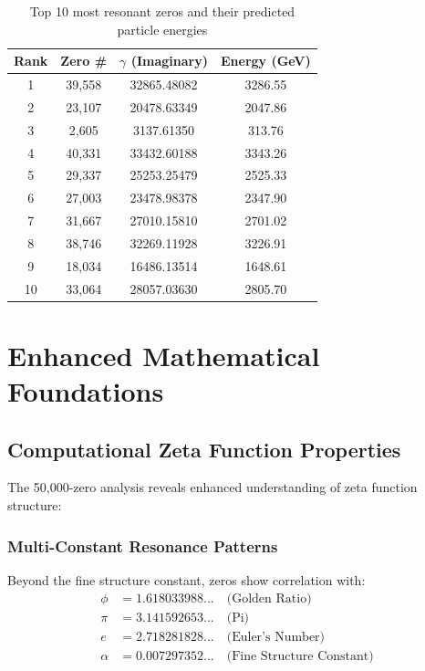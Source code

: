 \documentclass[12pt, a4paper]{article}
\begin{document}
\begin{table}[h]
\centering
\begin{tabular}{@{}cccc@{}}
\toprule
\textbf{Rank} & \textbf{Zero \#} & \textbf{$\gamma$ (Imaginary)} & \textbf{Energy (GeV)} \\
\midrule
1 & 39,558 & 32865.48082 & 3286.55 \\
2 & 23,107 & 20478.63349 & 2047.86 \\
3 & 2,605 & 3137.61350 & 313.76 \\
4 & 40,331 & 33432.60188 & 3343.26 \\
5 & 29,337 & 25253.25479 & 2525.33 \\
6 & 27,003 & 23478.98378 & 2347.90 \\
7 & 31,667 & 27010.15810 & 2701.02 \\
8 & 38,746 & 32269.11928 & 3226.91 \\
9 & 18,034 & 16486.13514 & 1648.61 \\
10 & 33,064 & 28057.03630 & 2805.70 \\
\bottomrule
\end{tabular}
\caption{Top 10 most resonant zeros and their predicted particle energies}
\end{table}

\section{Enhanced Mathematical Foundations}

\subsection{Computational Zeta Function Properties}
The 50,000-zero analysis reveals enhanced understanding of zeta function structure:

\subsubsection{Multi-Constant Resonance Patterns}
Beyond the fine structure constant, zeros show correlation with:
\begin{align}
\phi &= 1.618033988... \quad \text{(Golden Ratio)} \\
\pi &= 3.141592653... \quad \text{(Pi)} \\
e &= 2.718281828... \quad \text{(Euler's Number)} \\
\alpha &= 0.007297352... \quad \text{(Fine Structure Constant)}
\end{align}
\end{document}
